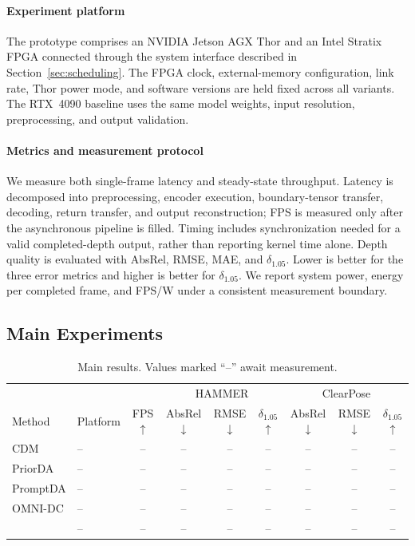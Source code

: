 \paragraph{Experiment platform}
The prototype comprises an NVIDIA Jetson AGX Thor and an Intel Stratix FPGA
connected through the system interface described in
Section~\ref{sec:scheduling}.  The FPGA clock, external-memory configuration,
link rate, Thor power mode, and software versions are held fixed across all
\system{} variants.  The RTX~4090 baseline uses the same model weights, input
resolution, preprocessing, and output validation.

\paragraph{Metrics and measurement protocol}
We measure both single-frame latency and steady-state throughput.  Latency is
decomposed into preprocessing, encoder execution, boundary-tensor transfer,
decoding, return transfer, and output reconstruction; FPS is measured only
after the asynchronous pipeline is filled.  Timing includes synchronization
needed for a valid completed-depth output, rather than reporting kernel time
alone.  Depth quality is evaluated with AbsRel, RMSE, MAE, and
$\delta_{1.05}$.  Lower is better for the three error metrics and higher is
better for $\delta_{1.05}$.  We report system power, energy per completed
frame, and FPS/W under a consistent measurement boundary.

\subsection{Main Experiments}
\label{sec:main-exp}

\begin{table}[t]
  \caption{Main results. Values marked ``--'' await measurement.}
  \label{tab:main-exp}
  \centering
  \small
  \setlength{\tabcolsep}{4pt}
  \renewcommand{\arraystretch}{1.10}
  \begin{tabular}{llc|ccc|ccc}
    \toprule
    & & & \multicolumn{3}{c|}{HAMMER} & \multicolumn{3}{c}{ClearPose} \\
    Method & Platform & FPS $\uparrow$
      & AbsRel $\downarrow$ & RMSE $\downarrow$ & $\delta_{1.05}$ $\uparrow$
      & AbsRel $\downarrow$ & RMSE $\downarrow$ & $\delta_{1.05}$ $\uparrow$ \\
    \midrule
    CDM & -- & -- & -- & -- & -- & -- & -- & -- \\
    PriorDA & -- & -- & -- & -- & -- & -- & -- & -- \\
    PromptDA & -- & -- & -- & -- & -- & -- & -- & -- \\
    OMNI-DC & -- & -- & -- & -- & -- & -- & -- & -- \\
    \system{} & -- & -- & -- & -- & -- & -- & -- & -- \\
    \bottomrule
  \end{tabular}
\end{table}

